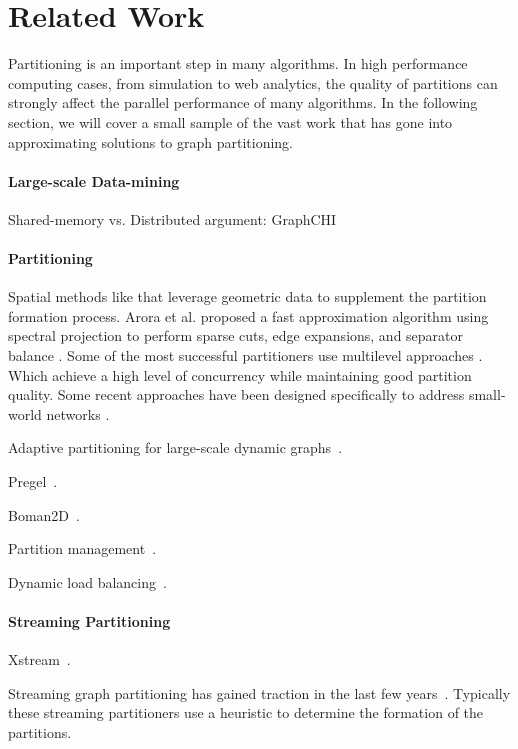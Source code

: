 \section{Related Work}
Partitioning is an important step in many algorithms.
In high performance computing cases, from simulation to web analytics, the quality of partitions can strongly affect the parallel performance of many algorithms.
In the following section, we will cover a small sample of the vast work that has gone into approximating solutions to graph partitioning.


\paragraph{Large-scale Data-mining}
Shared-memory vs. Distributed argument: GraphCHI~\cite{graphchi}


\paragraph{Partitioning}
Spatial methods like \cite{Gilbert95geometricmesh} that leverage geometric data to supplement the partition formation process.
Arora et al. proposed a fast approximation algorithm using spectral projection to perform sparse cuts, edge expansions, and separator balance \cite{arora2009expander}.
Some of the most successful partitioners use multilevel approaches \cite{karypis1998multilevel}.
Which achieve a high level of concurrency while maintaining good partition quality.
Some recent approaches have been designed specifically to address small-world networks \cite{slota2014pulp}.


Adaptive partitioning for large-scale dynamic graphs~\cite{Vaquero:2013:APL:2523616.2525943}.

Pregel~\cite{Malpregel}.

Boman2D~\cite{Bomansc13}.

Partition management~\cite{Yangpart}.

Dynamic load balancing~\cite{khayyatmizan}.





\paragraph{Streaming Partitioning}
Xstream~\cite{xstream}.

Streaming graph partitioning has gained traction in the last few years~\cite{DBLP:journals/corr/abs-1212-1121,Stanton:2012:SGP:2339530.2339722,tsourakakis2012fennel}.
Typically these streaming partitioners use a heuristic to determine the formation of the partitions.

